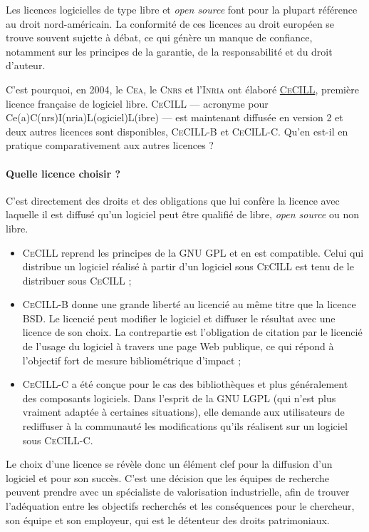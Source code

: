 Les licences logicielles de type libre et \textit{open source} font pour la plupart référence au droit nord-américain. La conformité de ces licences au droit européen se trouve souvent sujette à débat, ce qui génère un manque de confiance, notamment sur les principes de la garantie, de la responsabilité et du droit d'auteur.

C'est pourquoi, en 2004, le \textsc{Cea}, le \textsc{Cnrs} et l'\textsc{Inria} ont élaboré \href{https://cecill.info/}{\textsc{CeCILL}}, première licence française de logiciel libre. \textsc{CeCILL} --- acronyme pour Ce(a)C(nrs)I(nria)L(ogiciel)L(ibre) --- est maintenant diffusée en version 2 et deux autres licences sont disponibles, \textsc{CeCILL-B} et \textsc{CeCILL-C}. Qu'en est-il en pratique comparativement aux autres licences ?

\paragraph{Quelle licence choisir ?}

C'est directement des droits et des obligations que lui confère la licence avec laquelle il est diffusé qu'un logiciel peut être qualifié de libre, \textit{open source} ou non libre.
\begin{itemize}
	\item \textsc{CeCILL} reprend les principes de la GNU GPL et en est compatible. Celui qui distribue un logiciel réalisé à partir d'un logiciel sous \textsc{CeCILL} est tenu de le distribuer sous \textsc{CeCILL} ;
	\item \textsc{CeCILL-B} donne une grande liberté au licencié au même titre que la licence BSD. Le licencié peut modifier le logiciel et diffuser le résultat avec une licence de son choix. La contrepartie est l'obligation de citation par le licencié de l'usage du logiciel à travers une page Web publique, ce qui répond à l'objectif fort de mesure bibliométrique d'impact ;
	\item \textsc{CeCILL-C} a été conçue pour le cas des bibliothèques et plus généralement des composants logiciels. Dans l'esprit de la GNU LGPL (qui n'est plus vraiment adaptée à certaines situations), elle demande aux utilisateurs de rediffuser à la communauté les modifications qu'ils réalisent sur un logiciel sous \textsc{CeCILL-C}.
\end{itemize}

Le choix d'une licence se révèle donc un élément clef pour la diffusion d'un logiciel et pour son succès. C'est une décision que les équipes de recherche peuvent prendre avec un spécialiste de valorisation industrielle, afin de trouver l'adéquation entre les objectifs recherchés et les conséquences pour le chercheur, son équipe et son employeur, qui est le détenteur des droits patrimoniaux.

